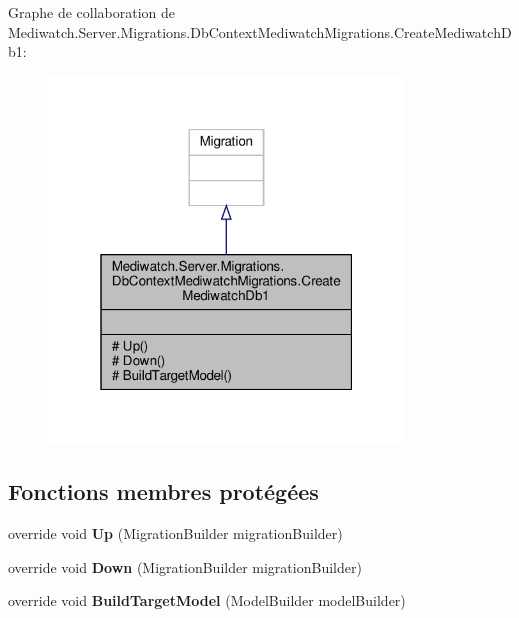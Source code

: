Graphe de collaboration de Mediwatch.\+Server.\+Migrations.\+Db\+Context\+Mediwatch\+Migrations.\+Create\+Mediwatch\+Db1\+:
\nopagebreak
\begin{figure}[H]
\begin{center}
\leavevmode
\includegraphics[width=268pt]{class_mediwatch_1_1_server_1_1_migrations_1_1_db_context_mediwatch_migrations_1_1_create_mediwatch_db1__coll__graph}
\end{center}
\end{figure}
\subsection*{Fonctions membres protégées}
\begin{DoxyCompactItemize}
\item 
\mbox{\label{class_mediwatch_1_1_server_1_1_migrations_1_1_db_context_mediwatch_migrations_1_1_create_mediwatch_db1_a9910c8d305cc20413878b58c0e75187d}} 
override void {\bfseries Up} (Migration\+Builder migration\+Builder)
\item 
\mbox{\label{class_mediwatch_1_1_server_1_1_migrations_1_1_db_context_mediwatch_migrations_1_1_create_mediwatch_db1_a06d022f49f792f45be01edb7b269b09e}} 
override void {\bfseries Down} (Migration\+Builder migration\+Builder)
\item 
\mbox{\label{class_mediwatch_1_1_server_1_1_migrations_1_1_db_context_mediwatch_migrations_1_1_create_mediwatch_db1_a4d319a2c51e1a5f8cfc06ee1da55dbcd}} 
override void {\bfseries Build\+Target\+Model} (Model\+Builder model\+Builder)
\end{DoxyCompactItemize}


